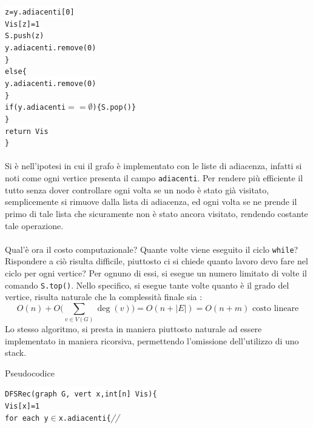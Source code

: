 \documentclass[12pt, letterpaper]{article}
\newcommand{\code}[1]{\colorbox{light-gray}{\texttt{#1}}}
\newcommand{\codee}[1]{\colorbox{white}{\texttt{#1}}}
\newcommand{\acc}{\\\hphantom{}\\}
\newcommand{\comm}[1]{\color{lg}\textit{\hphantom{spaz}// \text{#1}}\color{black}}
\begin{document}
\hphantom{ident}\hphantom{ident}\hphantom{ident}\codee{z=y.adiacenti[0]}\\
\hphantom{ident}\hphantom{ident}\hphantom{ident}\codee{Vis[z]=1}\\
\hphantom{ident}\hphantom{ident}\hphantom{ident}\codee{S.push(z)}\\
\hphantom{ident}\hphantom{ident}\hphantom{ident}\codee{y.adiacenti.remove(0)}\\
\hphantom{ident}\hphantom{ident}\codee{\}}\\
\hphantom{ident}\hphantom{ident}\codee{else\{}\\
\hphantom{ident}\hphantom{ident}\hphantom{ident}\codee{y.adiacenti.remove(0)}\\
\hphantom{ident}\hphantom{ident}\codee{\}}\\
\hphantom{ident}\hphantom{ident}\codee{if(y.adiacenti\(==\emptyset\))\{S.pop()\}}\\
\hphantom{ident}\codee{\}}\\
\hphantom{ident}\codee{return Vis}\\
\codee{\}}\acc
Si è nell'ipotesi in cui il grafo è implementato con le liste di adiacenza, infatti si noti come ogni vertice
presenta il campo \code{adiacenti}. Per rendere più efficiente il tutto senza dover controllare ogni volta se un
nodo è stato già visitato, semplicemente si rimuove dalla lista di adiacenza, ed ogni volta se ne prende il primo
di tale lista che sicuramente non è stato ancora visitato, rendendo costante tale operazione.\acc
Qual'è ora il costo computazionale? Quante  volte viene eseguito il ciclo \code{while}? Rispondere a ciò risulta
difficile, piuttosto ci si chiede quanto lavoro devo fare nel ciclo per ogni vertice? Per ognuno di essi, si
esegue un numero limitato di volte il comando \code{S.top()}. Nello specifico, si esegue tante volte quanto è il
grado del vertice, risulta naturale che la complessità finale sia :
$$O(n)+O\big( \sum_{v\in V(G)}\deg(v)\big)=O(n+|E|)=O(n+m)\text{ costo lineare}$$
Lo stesso algoritmo, si presta in maniera piuttosto naturale ad essere implementato in maniera ricorsiva,
permettendo l'omissione dell'utilizzo di uno stack.\begin{center}
    Pseudocodice
\end{center}
\codee{DFSRec(graph G, vert x,int[n] Vis)\{}\\
\hphantom{ident}\codee{Vis[x]=1}\\
\hphantom{ident}\codee{for each y\(\in\)x.adiacenti\{}\comm{per ogni adiacente di x}\\
\end{document}
